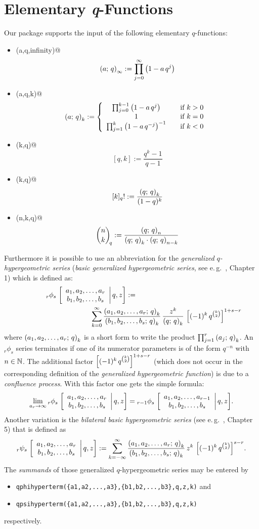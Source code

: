 \section{Elementary \textsl{q}-Functions}
Our package supports the input of the following elementary 
$q$-functions:
\begin{itemize}
%
\item {\verb@qpochhammer(a,q,infinity)@}\[
	\left(a;\,q\right)_{\infty}:= \prod_{j=0}^{\infty}{\left(1-a\,q^j\right)}
	\]
\item {\verb@qpochhammer(a,q,k)@} \[
	\qfac{a}{k}:= \funkdefff{\prod_{j=0}^{k-1}{\left(1-a\,q^j\right)}}%
		{k>0}{1}{k=0}{\prod_{j=1}^{k}{\left(1-a\,q^{-j}\right)^{-1}}}{k<0}
	\]
\item {\verb@qbrackets(k,q)@}
	\[  {}[q,k]:=\frac{q^k-1}{q-1}  \]
\item {\verb@qfactorial(k,q)@}
	\[   {}[k]_q!:= \frac{\left(q;\,q\right)_{k}}{(1-q)^k}  \]
\item {\verb@qbinomial(n,k,q)@}
	\[  {{n \choose k}\!}_q:=
		\frac{\left(q;\,q\right)_{n}}{\left(q;\,q\right)_{k}\cdot\left(q;\,q\right)_{n-k}} \]
\end{itemize}

Furthermore it is possible to use an abbreviation for the
{\sl generalized $q$-hypergeometric series}
({\sl basic generalized hypergeometric series}, 
see e.\,g.\ \cite{GasperRahman}, Chapter 1) which is defined as:
\begin{eqnarray*}
	\qphihyp{r}{s}{a_1,a_2,\ldots,a_r}{b_1,b_2,\ldots,b_s}{z}:= 
	\hspace{15em}\\ \hspace{10em}
	\sum_{k=0}^{\infty}{\frac{\qfac{a_1,a_2,\ldots,a_r}{k}}
	{\qfac{b_1,b_2,\ldots,b_s}{k}}
	\,\frac{z^k}{\qfac{q}{k}}\,\left[(-1)^k\,
	q^{\binomial{k}{2}}\right]^{1+s-r}}
\end{eqnarray*}
where $\left(a_1,a_2,\ldots,a_r;\,q\right)_{k}$ is a short form to write the
product $\prod_{j=1}^r{\left(a_j;\,q\right)_{k}}$. An ${}_r\phi_s$ series
terminates if one of its numerator parameters is of the form
$q^{-n}$ with $n\in\Bbb N$. The additional factor
$\left[(-1)^k\,q^{{k \choose 2}}\right]^{1+s-r}$ (which does not
occur in the corresponding definition of the {\sl generalized
hypergeometric function}) is due to a {\sl confluence process}.
With this factor one gets the simple formula:
\[
	\lim_{a_r\rightarrow\infty}{{}_{r}\phi_{s}\left.\left[\begin{array}{c} a_1,a_2,\ldots,a_r \\ b_1,b_2,\ldots,b_s \end{array}\right|q,z\right]} = 
	{{}_{r-1}\phi_{s}\left.\left[\begin{array}{c} a_1,a_2,\ldots,a_{r-1} \\ b_1,b_2,\ldots,b_s \end{array}\right|q,z\right]}.
\]
Another variation is the {\sl bilateral basic hypergeometric
series} (see e.\,g.\ \cite{GasperRahman}, Chapter 5) that is defined as
\[
	{}_{r}\psi_{s}\left.\left[\begin{array}{c} a_1,a_2,\ldots,a_r \\ b_1,b_2,\ldots,b_s \end{array}\right|q,z\right]:=
	\sum_{k=-\infty}^{\infty}{\frac{\left(a_1,a_2,\ldots,a_r;\,q\right)_{k}}
	{\left(b_1,b_2,\ldots,b_s;\,q\right)_{k}}\,z^k\,
	\left[(-1)^k\,q^{{k \choose 2}}\right]^{s-r}}.
\]
The \textsl{summands} of those generalized $q$-hypergeometric series may
be entered by
\begin{itemize}
	\item {\protect\verb-qphihyperterm({a1,a2,...,a3},{b1,b2,...,b3},q,z,k)-}
		and
	\item {\protect\verb-qpsihyperterm({a1,a2,...,a3},{b1,b2,...,b3},q,z,k)-}
\end{itemize}
respectively.

